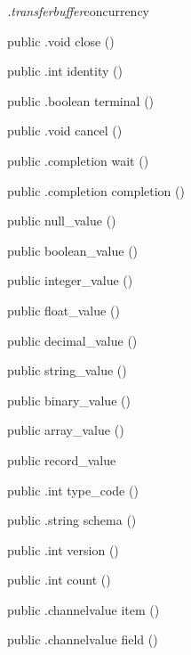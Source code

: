 \begin{CrexxClass}{\textit{.transferbuffer}}{concurrency}
\begin{Members}
    \Method
      {public}
      {.void}
      {close}
      {()}

    \Method
      {public}
      {.int}
      {identity}
      {()}

    \Method
      {public}
      {.boolean}
      {terminal}
      {()}

    \Method
      {public}
      {.void}
      {cancel}
      {()}

    \Method
      {public}
      {.completion}
      {wait}
      {()}

    \Method
      {public}
      {.completion}
      {completion}
      {()}

    \Factory
      {public}
      {null\_value}
      {()}

    \Factory
      {public}
      {boolean\_value}
      {()}

    \Factory
      {public}
      {integer\_value}
      {()}

    \Factory
      {public}
      {float\_value}
      {()}

    \Factory
      {public}
      {decimal\_value}
      {()}

    \Factory
      {public}
      {string\_value}
      {()}

    \Factory
      {public}
      {binary\_value}
      {()}

    \Factory
      {public}
      {array\_value}
      {()}

    \Factory
      {public}
      {record\_value}
      {}

    \Method
      {public}
      {.int}
      {type\_code}
      {()}

    \Method
      {public}
      {.string}
      {schema}
      {()}

    \Method
      {public}
      {.int}
      {version}
      {()}

    \Method
      {public}
      {.int}
      {count}
      {()}

    \Method
      {public}
      {.channelvalue}
      {item}
      {()}

    \Method
      {public}
      {.channelvalue}
      {field}
      {()}


\end{Members}
\end{CrexxClass}
